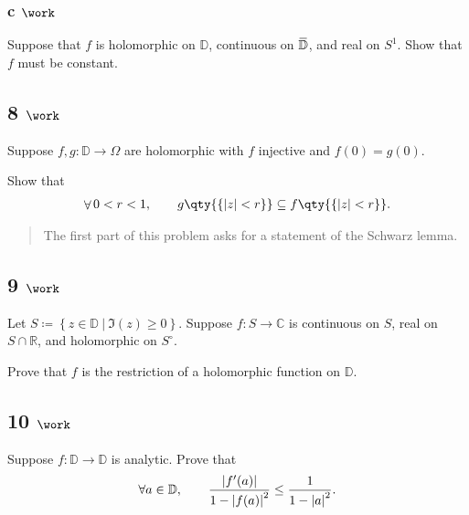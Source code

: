 \hypertarget{c-work-6}{%
\subsubsection{\texorpdfstring{c
\(\work\)}{c \textbackslash work}}\label{c-work-6}}

Suppose that \(f\) is holomorphic on \({\mathbb{D}}\), continuous on
\(\mkern 1.5mu\overline{\mkern-1.5mu{\mathbb{D}}\mkern-1.5mu}\mkern 1.5mu\),
and real on \(S^1\). Show that \(f\) must be constant.

\hypertarget{work-77}{%
\subsection{\texorpdfstring{8
\(\work\)}{8 \textbackslash work}}\label{work-77}}

Suppose \(f, g: {\mathbb{D}}\to \Omega\) are holomorphic with \(f\)
injective and \(f(0) = g(0)\).

Show that
\begin{align*}  
\mathop{\mathrm{\forall}}0 < r < 1,\qquad g\qty{\left\{{{\left\lvert {z} \right\rvert} < r}\right\}} \subseteq f\qty{\left\{{{\left\lvert {z} \right\rvert} < r}\right\}}
.\end{align*}

\begin{quote}
The first part of this problem asks for a statement of the Schwarz
lemma.
\end{quote}

\hypertarget{work-78}{%
\subsection{\texorpdfstring{9
\(\work\)}{9 \textbackslash work}}\label{work-78}}

Let
\(S\coloneqq\left\{{z\in {\mathbb{D}}{~\mathrel{\Big|}~}\Im(z) \geq 0}\right\}\).
Suppose \(f:S\to {\mathbb{C}}\) is continuous on \(S\), real on
\(S\cap{\mathbb{R}}\), and holomorphic on \(S^\circ\).

Prove that \(f\) is the restriction of a holomorphic function on
\({\mathbb{D}}\).

\hypertarget{work-79}{%
\subsection{\texorpdfstring{10
\(\work\)}{10 \textbackslash work}}\label{work-79}}

Suppose \(f:{\mathbb{D}}\to {\mathbb{D}}\) is analytic. Prove that
\begin{align*}  
\forall a\in {\mathbb{D}}, \qquad {{\left\lvert {f'(a)} \right\rvert} \over 1 - {\left\lvert {f(a)} \right\rvert}^2 } \leq {1 \over 1 - {\left\lvert {a} \right\rvert}^2}
.\end{align*}

